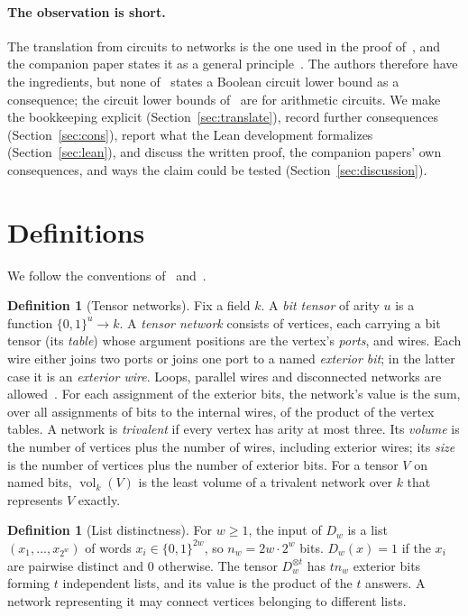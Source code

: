 \documentclass[11pt]{article}
\theoremstyle{definition}
\newtheorem{definition}[theorem]{Definition}
\newcommand{\vol}{\operatorname{vol}}
\newcommand{\Dw}{D_w}
\begin{document}
\paragraph{The observation is short.} The translation from circuits to networks is the one used in the proof of~\cite[Proposition~2.3]{OAI-MM}, and the companion paper states it as a general principle~\cite[Section~8]{OAI-Euc}. The authors therefore have the ingredients, but none of~\cite{OAI-MM,OAI-Euc,OAI-HC} states a Boolean circuit lower bound as a consequence; the circuit lower bounds of~\cite{OAI-HC} are for arithmetic circuits. We make the bookkeeping explicit (Section~\ref{sec:translate}), record further consequences (Section~\ref{sec:cons}), report what the Lean development formalizes (Section~\ref{sec:lean}), and discuss the written proof, the companion papers' own consequences, and ways the claim could be tested (Section~\ref{sec:discussion}).

\section{Definitions}\label{sec:defs}

We follow the conventions of~\cite[Section~2.1]{OAI-MM} and~\cite[Section~12.2]{OAI-HC}.

\begin{definition}[Tensor networks]
Fix a field $k$. A \emph{bit tensor} of arity $u$ is a function $\{0,1\}^u\to k$. A \emph{tensor network} consists of vertices, each carrying a bit tensor (its \emph{table}) whose argument positions are the vertex's \emph{ports}, and wires. Each wire either joins two ports or joins one port to a named \emph{exterior bit}; in the latter case it is an \emph{exterior wire}. Loops, parallel wires and disconnected networks are allowed~\cite[Section~12.2]{OAI-HC}. For each assignment of the exterior bits, the network's value is the sum, over all assignments of bits to the internal wires, of the product of the vertex tables. A network is \emph{trivalent} if every vertex has arity at most three. Its \emph{volume} is the number of vertices plus the number of wires, including exterior wires; its \emph{size} is the number of vertices plus the number of exterior bits. For a tensor $V$ on named bits, $\vol_k(V)$ is the least volume of a trivalent network over $k$ that represents $V$ exactly.
\end{definition}

\begin{definition}[List distinctness]
For $w\ge1$, the input of $\Dw$ is a list $(x_1,\dots,x_{2^w})$ of words $x_i\in\{0,1\}^{2w}$, so $n_w = 2w\cdot 2^w$ bits. $\Dw(x)=1$ if the $x_i$ are pairwise distinct and $0$ otherwise. The tensor $\Dw^{\otimes t}$ has $t n_w$ exterior bits forming $t$ independent lists, and its value is the product of the $t$ answers. A network representing it may connect vertices belonging to different lists.
\end{definition}
\end{document}
